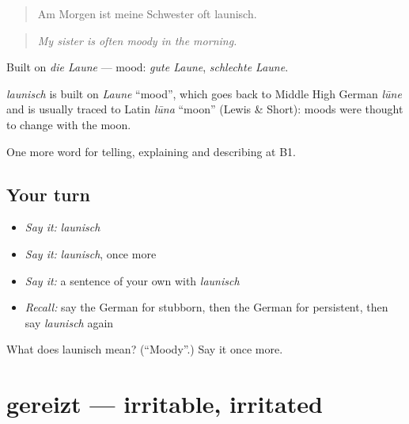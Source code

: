 \begin{quote}
Am Morgen ist meine Schwester oft launisch.
\end{quote}

\begin{quote}
\emph{My sister is often moody in the morning.}
\end{quote}

Built on \emph{die Laune} — mood: \emph{gute Laune}, \emph{schlechte Laune}.

\begin{cousinweb}
\emph{launisch} is built on \emph{Laune} \textquotedblleft{}mood\textquotedblright{}, which goes back to Middle High German \emph{lūne} and is usually traced to Latin \emph{lūna} \textquotedblleft{}moon\textquotedblright{} (Lewis \& Short): moods were thought to change with the moon.
\end{cousinweb}

\begin{grammarlens}[title={What you've built}]
One more word for telling, explaining and describing at B1.
\end{grammarlens}

\subsection*{Your turn}
\begin{itemize}
\raggedright
  \item \emph{Say it:} \emph{launisch}
  \item \emph{Say it:} \emph{launisch}, once more
  \item \emph{Say it:} a sentence of your own with \emph{launisch}
  \item \emph{Recall:} say the German for stubborn, then the German for persistent, then say \emph{launisch} again
\end{itemize}

\begin{tcolorbox}[breakable,colback=teal!4,colframe=teal!35!black,title={Before you move on}]
What does launisch mean? (\textquotedblleft{}Moody\textquotedblright{}.) Say it once more.
\end{tcolorbox}
\section[gereizt]{gereizt — irritable, irritated}

\label{lesson:GE-C476-gereizt}



